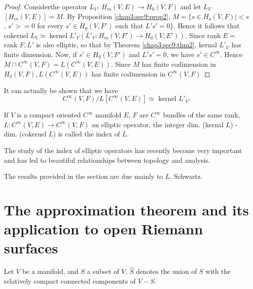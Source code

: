 \begin{proof}
  Consider\pageoriginale the operator $L_V$: $H_m (V, E) \to H_0 (V, F)$ and let
  $L_V$ $[H_m (V, E)] = M$. By Proposition \ref{chap3:sec9:prop2}, $M
  = \{s \in H_o (V, F) 
  | <s$, $s'> = 0$ for every $s' \in H_0 (V, F')$ such that $L' s' =
  0\}$. Hence it follows that cokernel $L_V \simeq $ kernel $L'_V
  (L'_V : H_m (V, F') \to H_0 (V,E'))$. Since rank $E=$ rank $F, L'$
  is also elliptic, so that by Theorem \ref{chap3:sec9:thm2}, kernal $L'_V$ has finite
  dimension. Now, if $s' \in H_0 (V, F')$ and $L' s' = 0$, we have $s'
  \in C^{\infty}$. Hence $M \cap C^{\infty} (V, F) = L
  (C^{\infty}(V,E))$. Since $M$ has finite codimension in $H_0 (V,F),
  L (C^{\infty} (V,E))$ has finite codimension in $C^{\infty} (V,F)$ 
\end{proof}

\begin{remark*}
  It can actually be shown that we have
  $$
  C^{\infty} (V,F) / L [C^{\infty} (V,E)] \simeq \text{ kernel } L'_V.
  $$
\end{remark*}

\begin{defi*}%
  If $V$ is a compact oriented $C^{\infty}$ manifold $E$, $F$ are
  $C^{\infty}$ bundles of the same rank, $L: C^{\infty} (V,E) \to
  C^\infty (V, F)$ an
  elliptic operator, the integer dim. (kernal $L$) - dim. (cokernel
  $L$) is called the index of $L$. 
\end{defi*}

The study of the index of elliptic operators has recently become very
important and has led to beautiful relationships between topology and
analysis. 

The results provided in the section are due mainly to $L$. Schwartz.

\section[The approximation theorem and its...]{The approximation theorem and its application to open Riemann
  surfaces}\label{chap3:sec10} %

\begin{defi*}%
  Let $V$ be a manifold, and $S$ a subset of $V$. $\hat{S}$ denotes
  the union of $S$ with the relatively compact connected components of
  $V-S$. 
\end{defi*}

